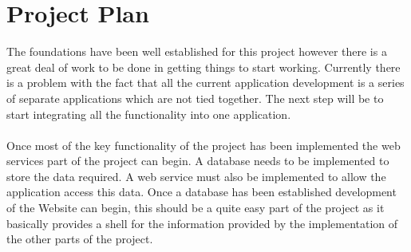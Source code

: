 \documentclass[12pt]{article}
\begin{document}

\section{Project Plan}

The foundations have been well established for this project however there is a great deal of work to be done in getting things to start working. Currently there is a problem with the fact that all the current application development is a series of separate applications which are not tied together. The next step will be to start integrating all the functionality into one application.

\paragraph{}
\label{par:First Paragraph}

Once most of the key functionality of the project has been implemented the web services part of the project can begin. A database needs to be implemented to store the data required. A web service must also be implemented to allow the application access this data. Once a database has been established development of the Website can begin, this should be a quite easy part of the project as it basically provides a shell for the information provided by the implementation of the other parts of the project.

\paragraph{}
\label{par:First Paragraph}
\end{document}
